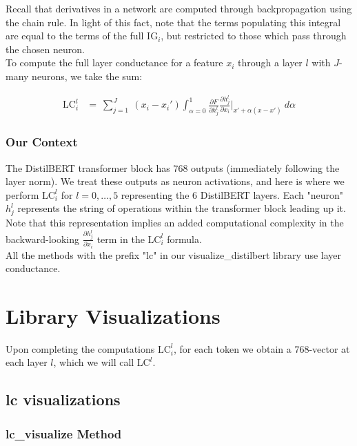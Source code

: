 \documentclass{article}
\begin{document}
Recall that derivatives in a network are computed through backpropagation using the chain rule.  In light of this fact, note that the terms populating this integral are equal to the terms of the full $\text{IG}_i$, but restricted to those which pass through the chosen neuron. \\

To compute the full layer conductance for a feature $x_i$ through a layer $l$ with $J$-many neurons, we take the sum:

\begin{align*}
\text{LC}_{i}^{l} &= \ \sum_{j=1}^{J} \ (x_i - x_i') \int_{\alpha=0}^{1} \frac{\partial F}{\partial {h_{j}^{l}}} \frac{\partial {h_{j}^{l}}}{\partial x_i} \Big|_{x' + \alpha (x - x')} \ d\alpha
\end{align*}

\subsubsection{Our Context}

The DistilBERT transformer block has $768$ outputs (immediately following the layer norm).  We treat these outputs as neuron activations, and here is where we perform $\text{LC}_{i}^{l}$ for $l = 0, \ldots, 5$ representing the $6$ DistilBERT layers.  Each "neuron" ${h_{j}^{l}}$ represents the string of operations within the transformer block leading up it. Note that this representation implies an added computational complexity in the backward-looking $\frac{\partial {h_{j}^{l}}}{\partial x_i}$ term in the $\text{LC}_{i}^{l}$ formula.  \\

All the methods with the prefix "lc" in our visualize\_distilbert library use layer conductance.

\section{Library Visualizations}

Upon completing the computations $ \text{LC}_{i}^{l}$, for each token we obtain a $768$-vector at each layer $l$, which we will call $\text{LC}^{l}$.

\subsection{lc visualizations}

\subsubsection*{lc\_visualize Method}
\end{document}
